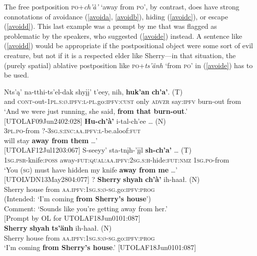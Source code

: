 \documentclass[output=paper,colorlinks,citecolor=brown
]{langscibook}
\begin{document}
The free postposition \textsc{po}+\textit{ch'à'} `away from \textsc{po}', by contrast, does have strong connotations of avoidance (\ref{avoida}, \ref{avoidb}), hiding (\ref{avoidc}), or escape (\ref{avoidd}). This last example was a prompt by me that was flagged as problematic by the speakers, who suggested (\ref{avoide}) instead. A sentence like (\ref{avoidd}) would be appropriate if the postpositional object were some sort of evil creature, but not if it is a respected elder like Sherry—in that situation, the (purely spatial) ablative postposition like \textsc{po}+\textit{ts'änh} `from \textsc{po}' in (\ref{avoide}) has to be used. 

\begin{exe}
\ex 
\label{avoid}
\begin{xlista}
\ex\label{avoida}
\gll Nts'ą' na-tthi-ts'el-dak shyįį' t'eey, nih, \textbf{huk'an} \textbf{ch'a'}. \textnormal{(T)} \\
and \textsc{cont}-out-\textsc{1pl.s:ø.ipfv:l-pl}.go:\textsc{ipfv:cust} only \textsc{advzr} say:\textsc{ipfv} burn-out from \\
\glt `And we were just running, she said, \textbf{from that burn-out}.' \\ \hfill [UTOLAF09Jun2402:028] 
\ex \label{avoidb}
\gll \textbf{Hu-ch'à'} {i-tal-ch'ee {\ldots} \textnormal{(N)}} \\
\textsc{3pl.po}-from \textsc{?-3sg.s:inc:aa.ipfv:l}-be.aloof:\textsc{fut} \\
 will stay \textbf{away from them} \ldots' \\ \hfill [UTOLAF12Jul1203:067]
\ex \label{avoidc}
\gll S-seeyy' sta-tnįh-'įįl {\textbf{sh-ch'a'} {\ldots} \textnormal{(T)}} \\
\textsc{1sg.psr}-knife:\textsc{poss} away-\textsc{fut:qual:aa.ipfv:2sg.s:h}-hide:\textsc{fut:nmz} \textsc{1sg.po}-from \\
\glt `You (\textsc{sg}) must have hidden my knife \textbf{away from me} \ldots' \\ \hfill [UTOLVDN13May2804:077]
\ex \label{avoidd}
\gll ? \textbf{Sherry} \textbf{shyah} \textbf{ch'à'} {ih-haał. \textnormal{(N)}} \\
{} Sherry house from \textsc{aa.ipfv:1sg.s:ø-sg}.go:\textsc{ipfv:prog} \\
\glt (Intended: `I'm coming \textbf{from Sherry's house}') \\ Comment: `Sounds like you're getting away from her.' \\ \hfill [Prompt by OL for UTOLAF18Jun0101:087]\\
\ex \label{avoide}
\gll \textbf{Sherry} \textbf{shyah} \textbf{ts'änh} {ih-haał. \textnormal{(N)}} \\
Sherry house from \textsc{aa.ipfv:1sg.s:ø-sg}.go:\textsc{ipfv:prog} \\
\glt `I'm coming \textbf{from Sherry's house}.' \hfill [UTOLAF18Jun0101:087]
\end{xlista}
\end{exe}
\end{document}
